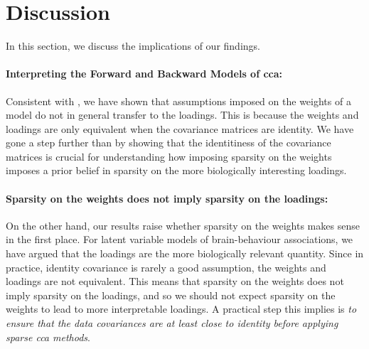 \newpage


\section{Discussion}

In this section, we discuss the implications of our findings.

\paragraph{Interpreting the Forward and Backward Models of \acrshort{cca}:} Consistent with \cite{haufe2014interpretation}, we have shown that assumptions imposed on the \gls{weights} of a model do not in general transfer to the loadings.
This is because the \gls{weights} and \gls{loadings} are only equivalent when the covariance matrices are identity.
We have gone a step further than \cite{haufe2014interpretation} by showing that the identitiness of the covariance matrices is crucial for understanding how imposing sparsity on the \gls{weights} imposes a prior belief in sparsity on the more biologically interesting loadings.

\paragraph{Sparsity on the \gls{weights} does not imply sparsity on the loadings:}

On the other hand, our results raise whether sparsity on the \gls{weights} makes sense in the first place.
For latent variable models of brain-behaviour associations, we have argued that the \gls{loadings} are the more biologically relevant quantity.
Since in practice, identity covariance is rarely a good assumption, the \gls{weights} and \gls{loadings} are not equivalent.
This means that sparsity on the \gls{weights} does not imply sparsity on the loadings, and so we should not expect sparsity on the \gls{weights} to lead to more interpretable loadings.
A practical step this implies is \textit{to ensure that the data covariances are at least close to identity before applying sparse \acrshort{cca} methods}.

